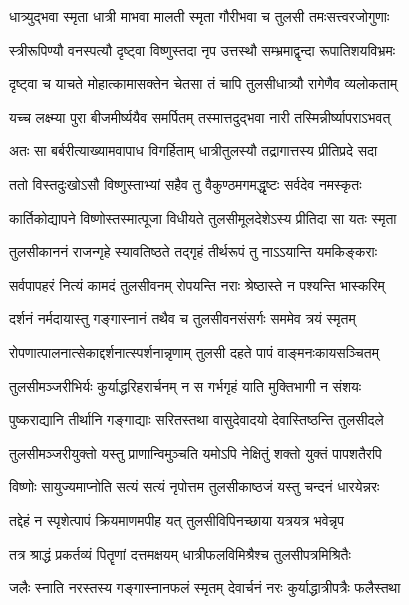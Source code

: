 \twolineshloka
{धात्र्युद्भवा स्मृता धात्री माभवा मालती स्मृता}
{गौरीभवा च तुलसी तमःसत्त्वरजोगुणाः} %

\twolineshloka
{स्त्रीरूपिण्यौ वनस्पत्यौ दृष्ट्वा विष्णुस्तदा नृप}
{उत्तस्थौ सम्भ्रमाद्वृन्दा रूपातिशयविभ्रमः} %

\twolineshloka
{दृष्ट्वा च याचते मोहात्कामासक्तेन चेतसा}
{तं चापि तुलसीधात्र्यौ रागेणैव व्यलोकताम्} %

\twolineshloka
{यच्च लक्ष्म्या पुरा बीजमीर्ष्ययैव समर्पितम्}
{तस्मात्तदुद्भवा नारी तस्मिन्नीर्ष्यापराऽभवत्} %

\twolineshloka
{अतः सा बर्बरीत्याख्यामवापाध विगर्हिताम्}
{धात्रीतुलस्यौ तद्रागात्तस्य प्रीतिप्रदे सदा} %

\twolineshloka
{ततो विस्तदुःखोऽसौ विष्णुस्ताभ्यां सहैव तु}
{वैकुण्ठमगमद्धृष्टः सर्वदेव नमस्कृतः} %

\twolineshloka
{कार्तिकोद्यापने विष्णोस्तस्मात्पूजा विधीयते}
{तुलसीमूलदेशेऽस्य प्रीतिदा सा यतः स्मृता} %

\twolineshloka
{तुलसीकाननं राजन्गृहे स्यावतिष्ठते}
{तद्गृहं तीर्थरूपं तु नाऽऽयान्ति यमकिङ्कराः} %

\twolineshloka
{सर्वपापहरं नित्यं कामदं तुलसीवनम्}
{रोपयन्ति नराः श्रेष्ठास्ते न पश्यन्ति भास्करिम्} %

\twolineshloka
{दर्शनं नर्मदायास्तु गङ्गास्नानं तथैव च}
{तुलसीवनसंसर्गः सममेव त्रयं स्मृतम्} %

\twolineshloka
{रोपणात्पालनात्सेकाद्दर्शनात्स्पर्शनान्नृणाम्}
{तुलसी दहते पापं वाङ्मनःकायसञ्चितम्} %

\twolineshloka
{तुलसीमञ्जरीभिर्यः कुर्याद्धरिहरार्चनम्}
{न स गर्भगृहं याति मुक्तिभागी न संशयः} %

\twolineshloka
{पुष्कराद्यानि तीर्थानि गङ्गाद्याः सरितस्तथा}
{वासुदेवादयो देवास्तिष्ठन्ति तुलसीदले} %

\twolineshloka
{तुलसीमञ्जरीयुक्तो यस्तु प्राणान्विमुञ्चति}
{यमोऽपि नेक्षितुं शक्तो युक्तं पापशतैरपि} %

\twolineshloka
{विष्णोः सायुज्यमाप्नोति सत्यं सत्यं नृपोत्तम}
{तुलसीकाष्ठजं यस्तु चन्दनं धारयेन्नरः} %

\twolineshloka
{तद्देहं न स्पृशेत्पापं क्रियमाणमपीह यत्}
{तुलसीविपिनच्छाया यत्रयत्र भवेन्नृप} %

\twolineshloka
{तत्र श्राद्धं प्रकर्तव्यं पितॄणां दत्तमक्षयम्}
{धात्रीफलविमिश्रैश्च तुलसीपत्रमिश्रितैः} %

\twolineshloka
{जलैः स्नाति नरस्तस्य गङ्गास्नानफलं स्मृतम्}
{देवार्चनं नरः कुर्याद्धात्रीपत्रैः फलैस्तथा} %

